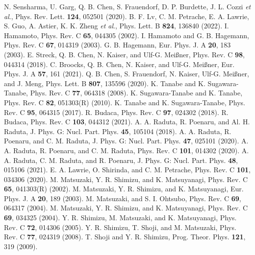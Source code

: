 \documentclass[aps,prc,preprint,showpacs,groupedaddress,floatfix,amsmath,amssymb]{revtex4-1}
\begin{document}
\begin{thebibliography}{100}
N. Sensharma, U. Garg, Q. B. Chen, S. Frauendorf, D. P. Burdette, J. L. Cozzi \textit{et al}., Phys. Rev. Lett. {\bf{124}}, 052501 (2020).
B. F. Lv, C. M. Petrache, E. A. Lawrie, S. Guo, A. Astier, K. K. Zheng \textit{et al}., Phys. Lett. B {\bf{824}}, 136840 (2022).
I. Hamamoto, Phys. Rev. C {\bf{65}}, 044305 (2002).
I. Hamamoto and G. B. Hagemann, Phys. Rev. C {\bf{67}}, 014319 (2003).
G. B. Hagemann, Eur. Phys. J. A {\bf{20}}, 183 (2003).
E. Streck, Q. B. Chen, N. Kaiser, and Ulf-G. Mei{\ss}ner, Phys. Rev. C {\bf{98}}, 044314 (2018).
C. Broocks, Q. B. Chen, N. Kaiser, and Ulf-G. Mei{\ss}ner, Eur. Phys. J. A {\bf{57}}, 161 (2021).
Q. B. Chen, S. Frauendorf, N. Kaiser, Ulf-G. Mei{\ss}ner, and J. Meng, Phys. Lett. B {\bf{807}}, 135596 (2020).
K. Tanabe and K. Sugawara-Tanabe, Phys. Rev. C {\bf{77}}, 064318 (2008).
K. Sugawara-Tanabe and K. Tanabe, Phys. Rev. C {\bf{82}}, 051303(R) (2010).
K. Tanabe and K. Sugawara-Tanabe, Phys. Rev. C {\bf{95}}, 064315 (2017).
R. Budaca, Phys. Rev. C {\bf{97}}, 024302 (2018).
R. Budaca, Phys. Rev. C {\bf{103}}, 044312 (2021).
A. A. Raduta, R. Poenaru, and Al. H. Raduta,  J. Phys. G: Nucl. Part. Phys. {\bf{45}}, 105104 (2018).
A. A. Raduta, R. Poenaru, and C. M. Raduta, J. Phys. G: Nucl. Part. Phys. {\bf{47}}, 025101 (2020).
A. A. Raduta, R. Poenaru, and C. M. Raduta, Phys. Rev. C {\bf{101}}, 014302 (2020).
A. A. Raduta, C. M. Raduta, and R. Poenaru, J. Phys. G: Nucl. Part. Phys. {\bf{48}}, 015106 (2021).
E. A. Lawrie, O. Shirinda, and C. M. Petrache, Phys. Rev. C {\bf{101}}, 034306 (2020).
M. Matsuzaki, Y. R. Shimizu, and K. Matsuyanagi, Phys. Rev. C {\bf{65}}, 041303(R) (2002).
M. Matsuzaki, Y. R. Shimizu, and K. Matsuyanagi, Eur. Phys. J. A {\bf{20}}, 189 (2003).
M. Matsuzaki, and S. I. Ohtsubo, Phys. Rev. C {\bf{69}}, 064317 (2004).
M. Matsuzaki, Y. R. Shimizu, and K. Matsuyanagi, Phys. Rev. C {\bf{69}}, 034325 (2004).
Y. R. Shimizu, M. Matsuzaki, and K. Matsuyanagi, Phys. Rev. C {\bf{72}}, 014306 (2005).
Y. R. Shimizu, T. Shoji, and M. Matsuzaki, Phys. Rev. C {\bf{77}}, 024319 (2008).
T. Shoji and Y. R. Shimizu, Prog. Theor. Phys. {\bf{121}}, 319 (2009).

\end{thebibliography}
\end{document}
